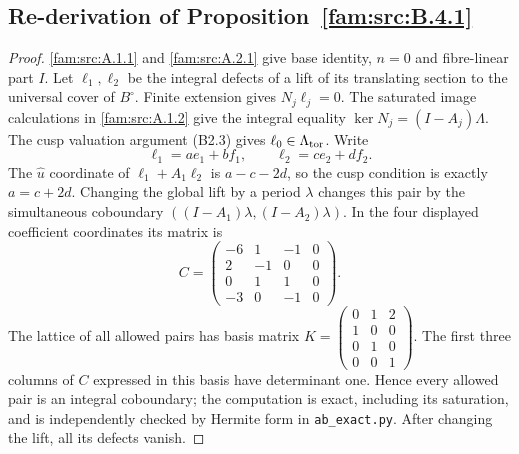 \subsection{Re-derivation of Proposition~\ref{fam:src:B.4.1}}\label{app:rederive:fam-src-B.4.1}
\begin{proof}
\ref{fam:src:A.1.1} and \ref{fam:src:A.2.1} give base identity, $n=0$ and fibre-linear part $I$. Let $\ell_1,\ell_2$ be the integral defects of a lift of its translating section to the universal cover of $B^\circ$. Finite extension gives $N_j\ell_j=0$. The saturated image calculations in \ref{fam:src:A.1.2} give the integral equality $\ker N_j=(I-A_j)\Lambda$. The cusp valuation argument (B2.3) gives $\ell_0\in\Lambda_{\rm tor}$. Write
\[
 \ell_1=ae_1+bf_1,\qquad \ell_2=ce_2+df_2.
\]
The $\widehat u$ coordinate of $\ell_1+A_1\ell_2$ is $a-c-2d$, so the cusp condition is exactly $a=c+2d$. Changing the global lift by a period $\lambda$ changes this pair by the simultaneous coboundary $((I-A_1)\lambda,(I-A_2)\lambda)$. In the four displayed coefficient coordinates its matrix is
\[
 C=\begin{pmatrix}-6&1&-1&0\\2&-1&0&0\\0&1&1&0\\-3&0&-1&0\end{pmatrix}.
\]
The lattice of all allowed pairs has basis matrix
$K=\left(\begin{smallmatrix}0&1&2\\1&0&0\\0&1&0\\0&0&1\end{smallmatrix}\right)$. The first three columns of $C$ expressed in this basis have determinant one. Hence every allowed pair is an integral coboundary; the computation is exact, including its saturation, and is independently checked by Hermite form in \texttt{ab\_exact.py}. After changing the lift, all its defects vanish.


\end{proof}
